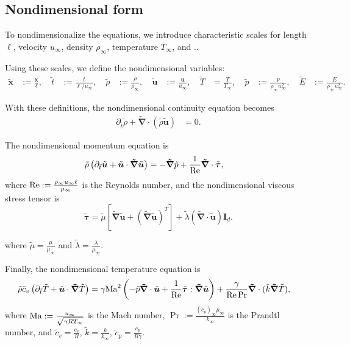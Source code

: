 \documentclass{article}
\begin{document}
\subsection{Nondimensional form}
To nondimensionalize the equations, we introduce characteristic scales for length $\ell$, velocity $u_\infty$, density $\rho_\infty$, temperature $T_\infty$, and ..

Using these scales, we define the nondimensional variables:
\begin{align*}
	\tilde{\bm{x}} & := \frac{\bm{x}}{\ell},              & \
	\tilde{t}      & := \frac{t}{\ell/ u_\infty},         & \
	\tilde{\rho}   & := \frac{\rho}{\rho_\infty},         & \
	\tilde{\bm{u}} & := \frac{\bm{u}}{u_\infty},          & \
	\tilde{T}      & = \frac{T}{T_\infty},                & \
	\tilde{p}      & := \frac{p}{\rho_\infty u_\infty^2}, & \
	\tilde{E}      & := \frac{E}{\rho_\infty u_\infty^2}.
\end{align*}

With these definitions, the nondimensional continuity equation becomes
\begin{align*}
	\partial_{\tilde{t}} \tilde{\rho} + \bm{\tilde{\nabla}}\cdot (\tilde{\rho} \tilde{\bm{u}}) & = 0.
\end{align*}

The nondimensional momentum equation is
\begin{align*}
	\tilde{\rho}\left(\partial_{\tilde{t}} \tilde{\bm{u}} + \tilde{\bm{u}}\cdot \bm{\tilde{\nabla}} \tilde{\bm{u}}\right) & = - \bm{\tilde{\nabla}} \tilde{p} + \frac{1}{\mathrm{Re}} \bm{\tilde{\nabla}} \cdot \tilde{\bm{\tau}},
\end{align*}
where $\mathrm{Re} := \frac{\rho_\infty u_\infty \ell}{\mu_\infty}$ is the Reynolds number, and the nondimensional viscous stress tensor is
\[\tilde{\bm{\tau}} = \tilde{\mu} \left[ \bm{\tilde{\nabla}} \tilde{\bm{u}} + (\bm{\tilde{\nabla}} \tilde{\bm{u}})^T\right] + \tilde{\lambda} (\bm{\tilde{\nabla}} \cdot \tilde{\bm{u}} )\bm{I}_d.\]

where $\tilde{\mu} = \frac{\mu}{\mu_\infty}$ and $\tilde{\lambda} = \frac{\lambda}{\mu_\infty}$.

Finally, the nondimensional temperature equation is
\begin{align*}
	\tilde{\rho} \tilde{c}_v \left(\partial_{\tilde{t}} \tilde{T} + \tilde{\bm{u}} \cdot \bm{\tilde{\nabla}} \tilde{T}\right) & = \gamma
	\mathrm{Ma}^2 \left(- \tilde{p} \bm{\tilde{\nabla}} \cdot \tilde{\bm{u}} + \frac{1}{\mathrm{Re}} \tilde{\bm{\tau}} : \bm{\tilde{\nabla}} \tilde{\bm{u}}\right) + \frac{\gamma}{\mathrm{Re} \Pr} \bm{\tilde{\nabla}} \cdot (\tilde{k} \bm{\tilde{\nabla}} \tilde{T}),
\end{align*}
where $\mathrm{Ma} := \frac{u_\infty}{\sqrt{\gamma R T_\infty}}$ is the Mach number, $\Pr := \frac{(c_p)_\infty \mu_\infty}{k_\infty}$ is the Prandtl number, and $\tilde{c}_v = \frac{c_v}{R}$, $\tilde{k} = \frac{k}{k_\infty}$, $\tilde{c}_p = \frac{c_p}{R\gamma}$.
\end{document}
